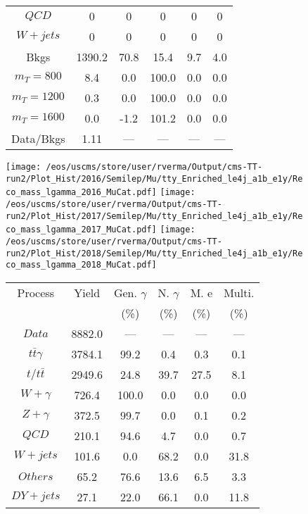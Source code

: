 \begin{figure}
\begin{minipage}[c]{0.32\textwidth}
{\begin{tabular}{cccccc}
$ QCD $ &  0 &  0 &  0 &  0 &  0\\
$ W+jets $ &  0 &  0 &  0 &  0 &  0\\
Bkgs &  1390.2 &  70.8 &  15.4 &  9.7 &  4.0\\
$ m_{T} = 800 $ &  8.4 &  0.0 &  100.0 &  0.0 &  0.0\\
$ m_{T} = 1200 $ &  0.3 &  0.0 &  100.0 &  0.0 &  0.0\\
$ m_{T} = 1600 $ &  0.0 &  -1.2 &  101.2 &  0.0 &  0.0\\
Data/Bkgs &  1.11 &  --- &  --- &  --- &  ---\\
\hline
\end{tabular}
}
\end{minipage}
\end{figure}

\begin{figure}
\centering
\texttt{[image: /eos/uscms/store/user/rverma/Output/cms-TT-run2/Plot\_Hist/2016/Semilep/Mu/tty\_Enriched\_le4j\_a1b\_e1y/Reco\_mass\_lgamma\_2016\_MuCat.pdf]}
\texttt{[image: /eos/uscms/store/user/rverma/Output/cms-TT-run2/Plot\_Hist/2017/Semilep/Mu/tty\_Enriched\_le4j\_a1b\_e1y/Reco\_mass\_lgamma\_2017\_MuCat.pdf]}
\texttt{[image: /eos/uscms/store/user/rverma/Output/cms-TT-run2/Plot\_Hist/2018/Semilep/Mu/tty\_Enriched\_le4j\_a1b\_e1y/Reco\_mass\_lgamma\_2018\_MuCat.pdf]}
\begin{minipage}[c]{0.32\textwidth}
\centering
\tiny{
\begin{tabular}{cccccc}
\hline
Process & Yield & Gen. $\gamma$ & N. $\gamma$ & M. e & Multi. \\
 &  & (\%) & (\%) & (\%) & (\%)  \\
\hline
                                                                      $ Data $ &  8882.0 &  --- &  --- &  --- &  ---\\
$ t\bar{t}\gamma $ &  3784.1 &  99.2 &  0.4 &  0.3 &  0.1\\
$ t/t\bar{t} $ &  2949.6 &  24.8 &  39.7 &  27.5 &  8.1\\
$ W+\gamma $ &  726.4 &  100.0 &  0.0 &  0.0 &  0.0\\
$ Z+\gamma $ &  372.5 &  99.7 &  0.0 &  0.1 &  0.2\\
$ QCD $ &  210.1 &  94.6 &  4.7 &  0.0 &  0.7\\
$ W+jets $ &  101.6 &  0.0 &  68.2 &  0.0 &  31.8\\
$ Others $ &  65.2 &  76.6 &  13.6 &  6.5 &  3.3\\
$ DY+jets $ &  27.1 &  22.0 &  66.1 &  0.0 &  11.8\\

\end{tabular}}
\end{minipage}
\end{figure}
